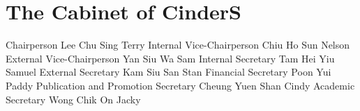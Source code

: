 \phantom{-}
\vfill

\section{The Cabinet of CinderS}
\blank[big]
\blank[big]
\startalignment[middle]
\dontleavehmode
\vbox{%
\starttabulate[|r|c|c|c|]
\HL
%
\NC {}
\NC {}
\NC {}
\NC {}
\fourperemspace\NC\NR
%
\HL
%
\NC Chairperson
\NC Lee Chu Sing
\NC Terry
\fourperemspace\NC\NR
%
\NC Internal Vice-Chairperson
\NC Chiu Ho Sun
\NC Nelson
\fourperemspace\NC\NR
%
\NC External Vice-Chairperson
\NC Yan Siu Wa
\NC Sam
\fourperemspace\NC\NR
%
\NC Internal Secretary
\NC Tam Hei Yiu
\NC Samuel
\fourperemspace\NC\NR
%
\NC External Secretary
\NC Kam Siu San
\NC Stan
\fourperemspace\NC\NR
%
\NC Financial Secretary
\NC Poon Yui
\NC Paddy
\fourperemspace\NC\NR
%
\NC \fourperemspace
Publication and Promotion Secretary
\NC Cheung Yuen Shan
\NC Cindy
\fourperemspace\NC\NR
%
\NC Academic Secretary
\NC Wong Chik On
\NC Jacky
\fourperemspace\NC\NR
%
\HL
\stoptabulate
}
\stopalignment

\vfill
\phantom{-}

\pagebreak
